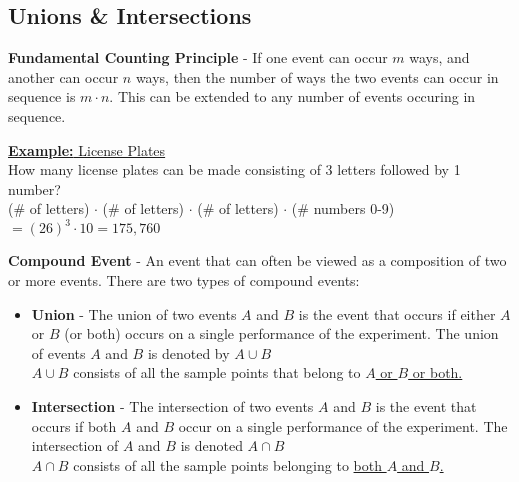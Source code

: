 \documentclass[a4paper]{article}
\let\bf\textbf
\begin{document}
\subsection{Unions \& Intersections}
\bf{Fundamental Counting Principle} - If one event can occur $m$ ways, and another can occur $n$ ways, then the number of ways the two events can occur in sequence is $m \cdot n$. This can be extended to any number of events occuring in sequence.
\begin{shaded}
    \underline{\bf{Example:} License Plates}
    \vspace{2mm}\\
    How many license plates can be made consisting of 3 letters followed by 1 number?\\
    (\# of letters) $\cdot$ (\# of letters) $\cdot$ (\# of letters) $\cdot$ (\# numbers 0-9) $= (26)^3 \cdot 10 = 175,760$
\end{shaded}
\noindent\bf{Compound Event} - An event that can often be viewed as a composition of two or more events. There are two types of compound events:
\begin{itemize}
    \item \bf{Union} - The union of two events $A$ and $B$ is the event that occurs if either $A$ or $B$ (or both) occurs on a single performance of the experiment. The union of events $A$ and $B$ is denoted by $A \cup B$\\ $A \cup B$ consists of all the sample points that belong to \underline{$A$ or $B$ or both.}
    \item \bf{Intersection} - The intersection of two events $A$ and $B$ is the event that occurs if both $A$ and $B$ occur on a single performance of the experiment. The intersection of $A$ and $B$ is denoted $A \cap B$\\ $A \cap B$ consists of all the sample points belonging to \underline{both $A$ and $B$.}
\end{itemize}
\end{document}
